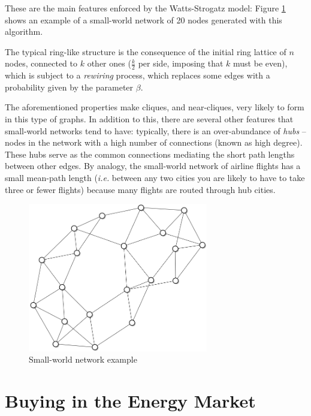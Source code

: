 \documentclass[11pt, twoside, titlepage, a4paper, openright]{report}
\begin{document}
These are the main features enforced by the Watts-Strogatz model: Figure \ref{fig:smallworld} shows an example of a small-world network of 20 nodes generated with this algorithm. 

The typical ring-like structure is the consequence of the initial ring lattice of $n$ nodes, connected to $k$ other ones ($\frac{k}{2}$ per side, imposing that $k$ must be even), which is subject to a \textit{rewiring} process, which replaces some edges with a probability given by the parameter $\beta$.

The aforementioned properties make cliques, and near-cliques, very likely to form in this type of graphs. In addition to this, there are several other features that small-world networks tend to have: typically, there is an over-abundance of \textit{hubs} -- nodes in the network with a high number of connections (known as high degree). These hubs serve as the common connections mediating the short path lengths between other edges. By analogy, the small-world network of airline flights has a small mean-path length (\textit{i.e.} between any two cities you are likely to have to take three or fewer flights) because many flights are routed through hub cities.

\begin{figure}[!h]
	\centering
	\includegraphics[width=0.7\textwidth]{img/smallworld.png}
	\caption{\label{fig:smallworld}Small-world network example}
\end{figure}

\section{Buying in the Energy Market}
\end{document}
